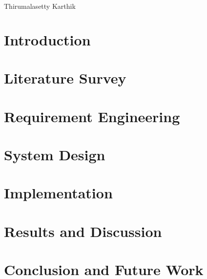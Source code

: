 \documentclass[a4paper, 11pt, oneside]{report}
\begin{document}
\begin{flushright}
    Thirumalasetty Karthik
\end{flushright}

	\vspace{1cm}
	
	\tableofcontents
	\listoffigures
        \listoftables
	\chapter{Introduction}
	
        \chapter{Literature Survey}
        
        \chapter{Requirement Engineering}
        
        \chapter{System Design}
        
        \chapter{Implementation}
        
        \chapter{Results and Discussion}
        
        \chapter{Conclusion and Future Work}
        
        
        
	
        
	
	
	
	
\end{document}

